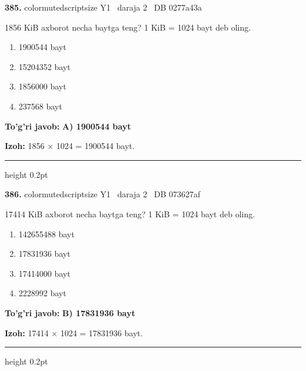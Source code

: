 \documentclass[10pt,a4paper,oneside]{article}
\begin{document}
\noindent\textbf{\color{ink}385.}  {color{muted}scriptsize Y1 \textbullet\ daraja 2 \textbullet\ DB 0277a43a}
\par
1856 KiB axborot necha baytga teng? 1 KiB = 1024 bayt deb oling.
\begin{enumerate}[label=\Alph*),leftmargin=9mm]
\item 1900544 bayt
\item 15204352 bayt
\item 1856000 bayt
\item 237568 bayt
\end{enumerate}
\begin{tcolorbox}[enhanced,breakable,colback=teal!4,colframe=teal!50!black,boxrule=0.5pt,arc=1.1mm,left=3mm,right=3mm,top=1.7mm,bottom=1.7mm,before skip=2mm,after skip=2mm]
\textbf{\color{teal}To'g'ri javob:} \textbf{A) 1900544 bayt}
\par\smallskip
\textbf{Izoh:} 1856 \ensuremath{\times} 1024 = 1900544 bayt.
\end{tcolorbox}
\vspace{2mm}\hrule height 0.2pt \vspace{3mm}

\noindent\textbf{\color{ink}386.}  {color{muted}scriptsize Y1 \textbullet\ daraja 2 \textbullet\ DB 073627af}
\par
17414 KiB axborot necha baytga teng? 1 KiB = 1024 bayt deb oling.
\begin{enumerate}[label=\Alph*),leftmargin=9mm]
\item 142655488 bayt
\item 17831936 bayt
\item 17414000 bayt
\item 2228992 bayt
\end{enumerate}
\begin{tcolorbox}[enhanced,breakable,colback=teal!4,colframe=teal!50!black,boxrule=0.5pt,arc=1.1mm,left=3mm,right=3mm,top=1.7mm,bottom=1.7mm,before skip=2mm,after skip=2mm]
\textbf{\color{teal}To'g'ri javob:} \textbf{B) 17831936 bayt}
\par\smallskip
\textbf{Izoh:} 17414 \ensuremath{\times} 1024 = 17831936 bayt.
\end{tcolorbox}
\vspace{2mm}\hrule height 0.2pt \vspace{3mm}
\end{document}
